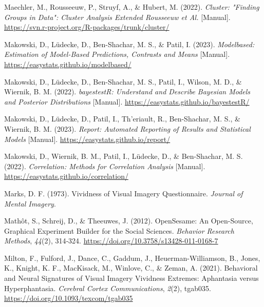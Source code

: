 \documentclass[
  12pt,
]{article}
\newlength{\cslhangindent}
\newlength{\cslentryspacingunit} %
\newenvironment{CSLReferences}[2] %
 {%
  \setlength{\parindent}{0pt}
  \ifodd #1
  \let\oldpar\par
  \def\par{\hangindent=\cslhangindent\oldpar}
  \fi
  \setlength{\parskip}{#2\cslentryspacingunit}
 }%
 {}
\begin{document}
\begin{CSLReferences}{1}{0}
\leavevmode{}%
Maechler, M., Rousseeuw, P., Struyf, A., \& Hubert, M. (2022).
\emph{Cluster: "{Finding Groups} in {Data}": {Cluster} Analysis Extended
Rousseeuw et Al.} {[}Manual{]}.
\url{https://svn.r-project.org/R-packages/trunk/cluster/}

\leavevmode{}%
Makowski, D., Lüdecke, D., Ben-Shachar, M. S., \& Patil, I. (2023).
\emph{Modelbased: {Estimation} of Model-Based Predictions, Contrasts and
Means} {[}Manual{]}. \url{https://easystats.github.io/modelbased/}

\leavevmode{}%
Makowski, D., Lüdecke, D., Ben-Shachar, M. S., Patil, I., Wilson, M. D.,
\& Wiernik, B. M. (2022). \emph{{bayestestR}: {Understand} and Describe
Bayesian Models and Posterior Distributions} {[}Manual{]}.
\url{https://easystats.github.io/bayestestR/}

\leavevmode{}%
Makowski, D., Lüdecke, D., Patil, I., Th'eriault, R., Ben-Shachar, M.
S., \& Wiernik, B. M. (2023). \emph{Report: {Automated} Reporting of
Results and Statistical Models} {[}Manual{]}.
\url{https://easystats.github.io/report/}

\leavevmode{}%
Makowski, D., Wiernik, B. M., Patil, I., Lüdecke, D., \& Ben-Shachar, M.
S. (2022). \emph{Correlation: {Methods} for Correlation Analysis}
{[}Manual{]}. \url{https://easystats.github.io/correlation/}

\leavevmode{}%
Marks, D. F. (1973). Vividness of Visual Imagery {Questionnaire}.
\emph{Journal of Mental Imagery}.

\leavevmode{}%
Mathôt, S., Schreij, D., \& Theeuwes, J. (2012). {OpenSesame}: {An}
Open-Source, Graphical Experiment Builder for the Social Sciences.
\emph{Behavior Research Methods}, \emph{44}(2), 314‑324.
\url{https://doi.org/10.3758/s13428-011-0168-7}

\leavevmode{}%
Milton, F., Fulford, J., Dance, C., Gaddum, J., Heuerman-Williamson, B.,
Jones, K., Knight, K. F., MacKisack, M., Winlove, C., \& Zeman, A.
(2021). Behavioral and {Neural Signatures} of {Visual Imagery Vividness
Extremes}: {Aphantasia} versus {Hyperphantasia}. \emph{Cerebral Cortex
Communications}, \emph{2}(2), tgab035.
\url{https://doi.org/10.1093/texcom/tgab035}


\end{CSLReferences}
\end{document}
